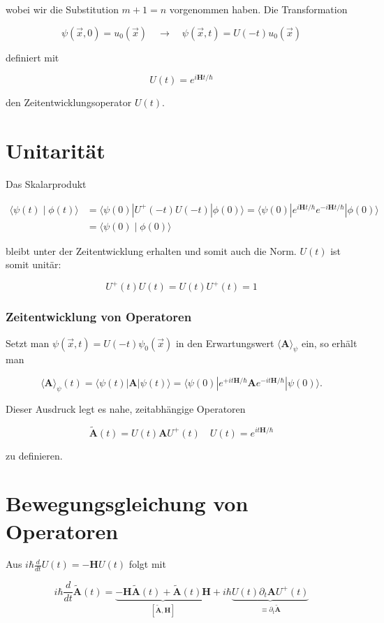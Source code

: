 \documentclass[10pt, letterpaper]{article}
\begin{document}
wobei wir die Substitution $m+1=n$ vorgenommen haben. Die Transformation

$$
\psi(\vec{x}, 0)=u_{0}(\vec{x}) \quad \rightarrow \quad \psi(\vec{x}, t)=U(-t) u_{0}(\vec{x})
$$

definiert mit

$$
U(t)=e^{i \mathbf{H} t / \hbar}
$$

den Zeitentwicklungsoperator $U(t)$.

\section*{Unitarität}
Das Skalarprodukt

$$
\begin{aligned}
\langle\psi(t) \mid \phi(t)\rangle & =\langle\psi(0)| U^{+}(-t) U(-t)|\phi(0)\rangle=\langle\psi(0)| e^{i \mathbf{H} t / \hbar} e^{-i \mathbf{H} t / \hbar}|\phi(0)\rangle \\
& =\langle\psi(0) \mid \phi(0)\rangle
\end{aligned}
$$

bleibt unter der Zeitentwicklung erhalten und somit auch die Norm. $U(t)$ ist somit unitär:

$$
U^{+}(t) U(t)=U(t) U^{+}(t)=1
$$

\subsubsection*{Zeitentwicklung von Operatoren}
Setzt man $\psi(\vec{x}, t)=U(-t) \psi_{0}(\vec{x})$ in den Erwartungswert $\langle\mathbf{A}\rangle_{\psi}$ ein, so erhält man

$$
\langle\mathbf{A}\rangle_{\psi}(t)=\langle\psi(t)| \mathbf{A}|\psi(t)\rangle=\langle\psi(0)| e^{+i t \mathbf{H} / \hbar} \mathbf{A} e^{-i t \mathbf{H} / \hbar}|\psi(0)\rangle .
$$

Dieser Ausdruck legt es nahe, zeitabhängige Operatoren

$$
\tilde{\mathbf{A}}(t)=U(t) \mathbf{A} U^{+}(t) \quad U(t)=e^{i t \mathbf{H} / \hbar}
$$

zu definieren.

\section*{Bewegungsgleichung von Operatoren}
Aus $i \hbar \frac{d}{d t} U(t)=-\mathbf{H} U(t)$ folgt mit

$$
i \hbar \frac{d}{d t} \tilde{\mathbf{A}}(t)=\underbrace{-\mathbf{H} \tilde{\mathbf{A}}(t)+\tilde{\mathbf{A}}(t) \mathbf{H}}_{[\tilde{\mathbf{A}}, \mathbf{H}]}+i \hbar \underbrace{U(t) \partial_{t} \mathbf{A} U^{+}(t)}_{\equiv \partial_{t} \tilde{\mathbf{A}}}
$$
\end{document}
